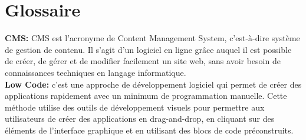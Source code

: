\chapter{Glossaire}
\label{chap:Glossary} 


\textbf{CMS:} CMS est l’acronyme de Content Management System, c’est-à-dire système de gestion de contenu. Il s’agit d’un logiciel en ligne grâce auquel il est possible de créer, de gérer et de modifier facilement un site web, sans avoir besoin de connaissances techniques en langage informatique.\\

\textbf{Low Code:} c'est une approche de développement logiciel qui permet de créer des applications rapidement avec un minimum de programmation manuelle. Cette méthode utilise des outils de développement visuels pour permettre aux utilisateurs de créer des applications en drag-and-drop, en cliquant sur des éléments de l’interface graphique et en utilisant des blocs de code préconstruits.


\pagebreak